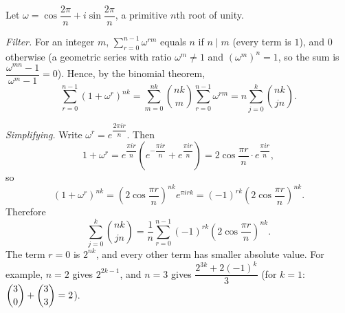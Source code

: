 Let $\omega=\cos\dfrac{2\pi}{n}+i\sin\dfrac{2\pi}{n}$, a primitive $n$th root of unity.

\emph{Filter.} For an integer $m$, $\displaystyle\sum_{r=0}^{n-1}\omega^{rm}$ equals $n$ if $n\mid m$ (every term is $1$), and $0$ otherwise (a geometric series with ratio $\omega^m\ne1$ and $\left(\omega^m\right)^n=1$, so the sum is $\dfrac{\omega^{mn}-1}{\omega^m-1}=0$). Hence, by the binomial theorem,
\[\sum_{r=0}^{n-1}\left(1+\omega^r\right)^{nk}=\sum_{m=0}^{nk}\binom{nk}{m}\sum_{r=0}^{n-1}\omega^{rm}=n\sum_{j=0}^{k}\binom{nk}{jn}.\]

\emph{Simplifying.} Write $\omega^r=e^{\dfrac{2\pi ir}{n}}$. Then
\[1+\omega^r=e^{\dfrac{\pi ir}{n}}\left(e^{-\dfrac{\pi ir}{n}}+e^{\dfrac{\pi ir}{n}}\right)=2\cos\dfrac{\pi r}{n}\cdot e^{\dfrac{\pi ir}{n}},\]
so
\[\left(1+\omega^r\right)^{nk}=\left(2\cos\dfrac{\pi r}{n}\right)^{nk}e^{\pi irk}=(-1)^{rk}\left(2\cos\dfrac{\pi r}{n}\right)^{nk}.\]
Therefore
\[\boxed{\sum_{j=0}^{k}\binom{nk}{jn}=\dfrac1n\sum_{r=0}^{n-1}(-1)^{rk}\left(2\cos\dfrac{\pi r}{n}\right)^{nk}}.\]
The term $r=0$ is $2^{nk}$, and every other term has smaller absolute value. For example, $n=2$ gives $2^{2k-1}$, and $n=3$ gives $\dfrac{2^{3k}+2(-1)^k}{3}$ (for $k=1$: $\dbinom30+\dbinom33=2$).
